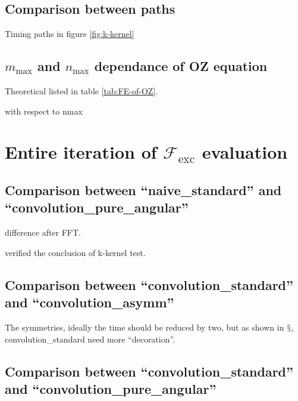 \subsection{Comparison between paths}

Timing paths in figure \ref{fig:k-kernel}


\subsection{$m_{\max}$ and $n_{\max}$ dependance of OZ equation}

Theoretical listed in table \ref{tab:FE-of-OZ}. 

with respect to nmax


\section{Entire iteration of $\mathcal{F}_{\mathrm{exc}}$ evaluation}


\subsection{Comparison between ``naive\_standard'' and ``convolution\_pure\_angular''}

\begin{figure}[h]
\caption{}
\end{figure}


difference after FFT.

verified the conclusion of k-kernel test.


\subsection{Comparison between ``convolution\_standard'' and ``convolution\_asymm''}

\begin{figure}[h]
\caption{}
\end{figure}


The symmetries, ideally the time should be reduced by two, but as
shown in $\mathsection$, convolution\_standard need more ``decoration''.


\subsection{Comparison between ``convolution\_standard'' and ``convolution\_pure\_angular''}

\begin{figure}[h]
\caption{}
\end{figure}


